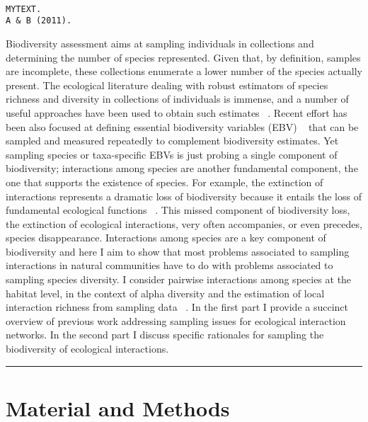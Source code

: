 \begin{adjustwidth}{2.5em}{2.5em}
\begin{verbatim}

MYTEXT.   
A & B (2011).   

\end{verbatim}
\end{adjustwidth}

Biodiversity assessment aims at sampling individuals in collections and determining the number of species represented. Given that, by definition, samples are incomplete, these collections enumerate a lower number of the species actually present. The ecological literature dealing with robust estimators of species richness and diversity in collections of individuals is immense, and a number of useful approaches have been used to obtain such estimates ~\citep{Magurran:1988mm,Gotelli:2001uo,Hortal:2006dc,Colwell:2009gv,Gotelli:2011tb}. Recent effort has been also focused at defining essential biodiversity variables (EBV) ~\citep{Pereira:2013ji} that can be sampled and measured repeatedly to complement biodiversity estimates. Yet sampling species or taxa-specific EBVs is just probing a single component of biodiversity; interactions among species are another fundamental component, the one that supports the existence of species. For example, the extinction of interactions represents a dramatic loss of biodiversity because it entails the loss of fundamental ecological functions ~\citep{ValienteBanuet:2014bw}. This missed component of biodiversity loss, the extinction of ecological interactions, very often accompanies, or even precedes, species disappearance. Interactions among species are a key component of biodiversity and here I aim to show that most problems associated to sampling interactions in natural communities have to do with problems associated to sampling species diversity. I consider pairwise interactions among species at the habitat level, in the context of alpha diversity and the estimation of local interaction richness from sampling data ~\citep{Mao:2005tka}. In the first part I provide a succinct overview of previous work addressing sampling issues for ecological interaction networks. In the second part I discuss specific rationales for sampling the biodiversity of ecological interactions. 

\begin{center}\rule{3in}{0.4pt}\end{center}


\section{Material and Methods}
\label{materialandmethods}

